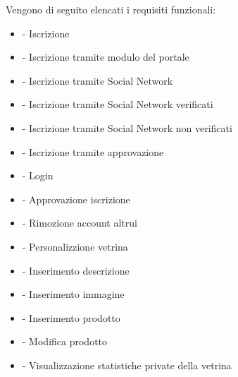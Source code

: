 \label{sub:requisiti_funzionali}
Vengono di seguito elencati i requisiti funzionali:
\begin{itemize} 
	\item {} - Iscrizione
	\item {} - Iscrizione tramite modulo del portale 	
	\item {} - Iscrizione tramite Social Network	
	\item {} - Iscrizione tramite Social Network verificati
	\item {} - Iscrizione tramite Social Network non verificati	
	\item {} - Iscrizione tramite approvazione
	
	\item {} - Login 
	\countReset 
	
	\item {} - Approvazione iscrizione
	
	\item {} - Rimozione account altrui 
	\countReset
	
	\item {} - Personalizzione vetrina	
	\item {} - Inserimento descrizione	
	\item {} - Inserimento immagine
	\item {} - Inserimento prodotto
	\item {} - Modifica prodotto
	
	\item {} - Visualizzazione statistiche private della vetrina
	\countReset
	

\end{itemize}
